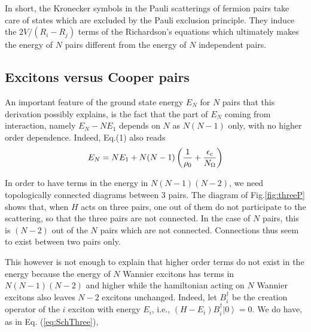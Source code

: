 \documentclass[epj]{svjour}
\begin{document}
In short, the Kronecker symbols in the Pauli scatterings of fermion pairs
take care of states which are excluded by the Pauli exclusion principle. They induce the $2V/(R_i-R_j)$ terms
of the Richardson's equations which ultimately makes the energy of $N$ pairs different
from the energy of $N$ independent pairs.

\subsection{Excitons versus Cooper pairs}

An important feature of the ground state energy $E _N$ for $N$ pairs that
this  derivation possibly explains, is the fact that the
part of $E_N$ coming from interaction, namely $E _N-N%
E _1$ depends on $N$ as $N(N-1)$ only, with no higher order dependence. Indeed, Eq.(1)  also reads
\begin{equation}  \label{eq:en}
E _N=NE _1+N(N-1)\left(\frac{1}{\rho_0} +\frac{\epsilon_c}{%
N_\Omega}\right) 
\end{equation}

In order to have terms in the energy in $N(N-1)(N-2)$, we need topologically connected
diagrams between 3 pairs. The diagram of Fig.\ref{fig:threeP} shows that, when $H$ acts on three pairs, one out of them do not participate to the scattering, so that the three pairs are not connected. In the case of $N$ pairs, this is $(N-2)$ out of the $N$ pairs which are not connected. Connections thus seem to exist between two pairs only. 

This however is not enough to explain that higher order terms do not exist in the energy because the energy of $N$ Wannier excitons has terms in $N(N-1)(N-2)$ and higher\cite{monicOdil}  while the hamiltonian acting on $N$ Wannier excitons  also leaves $N-2$ excitons unchanged. Indeed, let $B_i^\dagger$ be the creation operator of the $i$ exciton with energy $E_i$, i.e., $(H-E_i)B^\dagger_i\left|0\right>=0$.  We do have, as in Eq. (\ref{eq:SchThree}), 
\end{document}
